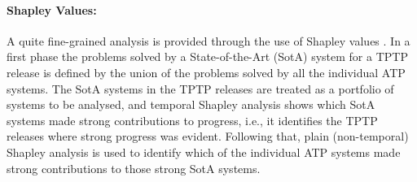 \documentclass[runningheads]{llncs}
\begin{document}
\paragraph{Shapley Values:}
A quite fine-grained analysis is provided through the use of Shapley values \cite{XH+12}.
In a first phase the problems solved by a State-of-the-Art (SotA) system for a TPTP release is 
defined by the union of the problems solved by all the individual ATP systems.
The SotA systems in the TPTP releases are treated as a portfolio of systems to be analysed, and 
temporal Shapley analysis \cite{KF+19} shows which SotA systems made strong contributions to 
progress, i.e., it identifies the TPTP releases where strong progress was evident.
Following that, plain (non-temporal) Shapley analysis \cite{FK+16} is used to identify which of 
the individual ATP systems made strong contributions to those strong SotA systems.
\end{document}
